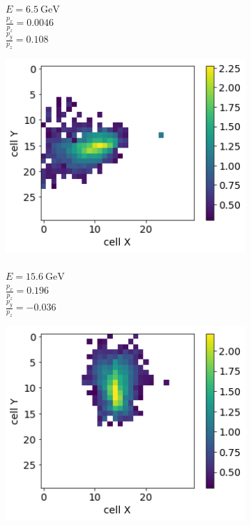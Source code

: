 \documentclass{webofc}
\begin{document}
\begin{figure}
\begin{subfigure}{0.24\textwidth}
    \caption{\\$E = 6.5~\text{GeV}$ \\  $\frac{p_x}{p_z}=0.0046$ \\$\frac{p_y}{p_z}=0.108$}\label{fig:gen-imgs-2}
  \end{subfigure}
    \begin{subfigure}{0.24\textwidth}
    \centering
    \includegraphics[width=1\textwidth]{figures/3_gen.png}
    \caption{\\$E = 15.6~\text{GeV}$ \\ $\frac{p_x}{p_z}=0.196$ \\ $\frac{p_y}{p_z}=-0.036$}\label{fig:gen-imgs-3}
  \end{subfigure}
  \begin{subfigure}{0.24\textwidth}
    \centering
    \includegraphics[width=1\textwidth]{figures/4_gen.png}

\end{subfigure}
\end{figure}
\end{document}
